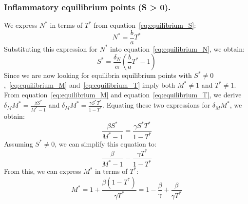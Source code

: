 \documentclass[a4paper, 12pt]{article}
\providecommand{\DIFaddtex}[1]{{\protect\color{blue} \sf #1}} %
\providecommand{\DIFdeltex}[1]{{\protect\color{red} \scriptsize #1}} %
\providecommand{\DIFaddbegin}{} %
\providecommand{\DIFaddend}{} %
\providecommand{\DIFdelbegin}{} %
\providecommand{\DIFdelend}{} %
\providecommand{\DIFadd}[1]{\texorpdfstring{\DIFaddtex{#1}}{#1}} %
\providecommand{\DIFdel}[1]{\texorpdfstring{\DIFdeltex{#1}}{}} %
\begin{document}
\DIFdelend \subsubsection{Inflammatory equilibrium points (S > 0).}\label{sec:inflammatory_equilibria}
We express $N^*$ in terms of $T^*$ from equation~\eqref{eq:equilibrium_S}:
\begin{equation}
N^* = \frac{b}{a} T^*
\label{eq:N_in_terms_of_T}
\end{equation}
Substituting this expression for $N^*$ into equation~\eqref{eq:equilibrium_N}, we obtain:
\begin{equation}
S^* = \frac{\delta_N}{\alpha} \left(\frac{b}{a} T^* - 1\right)
\label{eq:S_in_terms_of_T}
\end{equation}
Since we are now looking for \DIFdelbegin \DIFdel{equilibria }\DIFdelend \DIFaddbegin \DIFadd{equilibrium }\DIFaddend points with $S^* \neq 0$,~\eqref{eq:equilibrium_M} and~\eqref{eq:equilibrium_T} imply both $M^* \neq 1$ and $T^* \neq 1$.
From equation~\eqref{eq:equilibrium_M} and equation~\eqref{eq:equilibrium_T}, 
we derive  $\delta_M M^* = \frac{\beta S^*}{M^* - 1}$ and $\delta_M M^* = \frac{\gamma S^* T^*}{1 - T^*}$.
Equating these two expressions for $\delta_M M^*$, we obtain:
\[\frac{\beta S^*}{M^* - 1} = \frac{\gamma S^* T^*}{1 - T^*}
\]
Assuming $S^* \neq 0$, we can simplify this equation to:
\[\frac{\beta}{M^* - 1} = \frac{\gamma T^*}{1 - T^*}
\]
From this, we can express $M^*$ in terms of $T^*$:
\begin{equation}
M^* = 1 + \frac{\beta (1 - T^*)}{\gamma T^*} = 1 - \frac{\beta}{\gamma} + \frac{\beta}{\gamma T^*}
\label{eq:M_in_terms_of_T}
\end{equation}  
\end{document}
